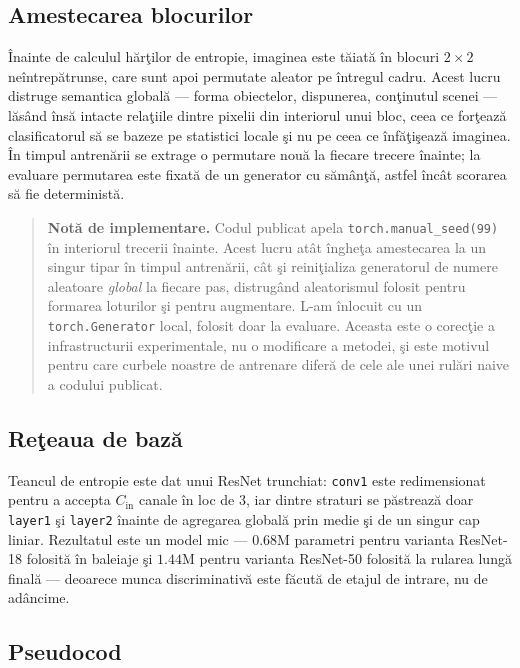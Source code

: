 \subsection{Amestecarea blocurilor}

Înainte de calculul hărţilor de entropie, imaginea este tăiată în blocuri
$2\times2$ neîntrepătrunse, care sunt apoi permutate aleator pe întregul cadru.
Acest lucru distruge semantica globală --- forma obiectelor, dispunerea,
conţinutul scenei --- lăsând însă intacte relaţiile dintre pixelii din interiorul
unui bloc, ceea ce forţează clasificatorul să se bazeze pe statistici locale şi
nu pe ceea ce înfăţişează imaginea. În timpul antrenării se extrage o permutare
nouă la fiecare trecere înainte; la evaluare permutarea este fixată de un
generator cu sămânţă, astfel încât scorarea să fie deterministă.

\begin{quote}\small
\textbf{Notă de implementare.} Codul publicat apela
\texttt{torch.manual\_seed(99)} în interiorul trecerii înainte. Acest lucru atât
îngheţa amestecarea la un singur tipar în timpul antrenării, cât şi reiniţializa
generatorul de numere aleatoare \emph{global} la fiecare pas, distrugând
aleatorismul folosit pentru formarea loturilor şi pentru augmentare. L-am
înlocuit cu un \texttt{torch.Generator} local, folosit doar la evaluare. Aceasta
este o corecţie a infrastructurii experimentale, nu o modificare a metodei, şi
este motivul pentru care curbele noastre de antrenare diferă de cele ale unei
rulări naive a codului publicat.
\end{quote}

\subsection{Reţeaua de bază}

Teancul de entropie este dat unui ResNet trunchiat: \texttt{conv1} este
redimensionat pentru a accepta $C_{\text{in}}$ canale în loc de $3$, iar dintre
straturi se păstrează doar \texttt{layer1} şi \texttt{layer2} înainte de
agregarea globală prin medie şi de un singur cap liniar. Rezultatul este un
model mic --- $0.68$M parametri pentru varianta ResNet-18 folosită în baleiaje
şi $1.44$M pentru varianta ResNet-50 folosită la rularea lungă finală ---
deoarece munca discriminativă este făcută de etajul de intrare, nu de adâncime.

\subsection{Pseudocod}

